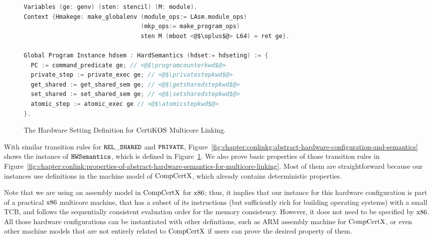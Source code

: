 \begin{figure}
\begin{lstlisting}[language=C]
Variables (ge: genv) (sten: stencil) (M: module).
Context {Hmakege: make_globalenv (module_ops:= LAsm.module_ops) 
                                 (mkp_ops:= make_program_ops) 
                                 sten M (mboot <@$\oplus$@> L64) = ret ge}.

Global Program Instance hdsem : HardSemantics (hdset:= hdseting) := {
  PC := command_predicate ge; // <@$\programcounterkwd$@>
  private_step := private_exec ge; // <@$\privatestepkwd$@>
  get_shared := get_shared_sem ge; // <@$\getsharedstepkwd$@>
  set_shared := set_shared_sem ge; // <@$\setsharedstepkwd$@>
  atomic_step := atomic_exec ge // <@$\atomicstepkwd$@>
}.
\end{lstlisting}
\caption{The Hardware Setting Definition for $\mathrm{CertiKOS}$ Multicore Linking.}
\label{fig:chapter:certikos:hardware-local-step-transition-rules}
\end{figure}

With similar transition rules for ${{\mathrm{\texttt{REL}}}\_{\mathrm{\texttt{SHARED}}}}$ and ${{\mathrm{\texttt{PRIVATE}}}}$,
Figure~\ref{fig:chapter:conlinkg:abstract-hardware-configuration-and-semantics}
shows the instance of ${\mathrm{\texttt{HWSemantics}}}$, which is defined in Figure~\ref{fig:chapter:certikos:hardware-local-step-transition-rules}. 
We also prove basic properties of those transition rules in Figure~\ref{fig:chapter:conlink:properties-of-abstract-hardware-semantics-for-multicore-linking}.
Most of them are straightforward because our instances use  definitions in the machine model of $\mathrm{CompCertX}$,
which already contains  deterministic properties. 

Note that we are using an assembly model  in $\mathrm{CompCertX}$ for $\mathrm{x86}$; thus, it implies that 
our instance for this hardware configuration is   part of a practical $\mathrm{x86}$ multicore machine,
that has a subset of its instructions (but sufficiently rich for building operating systems) with a small TCB, 
and follows the sequentially consistent evaluation order for the memory consistency. 
However, it does not need to be specified by $\mathrm{x86}$. 
All those hardware configurations can be instantiated with other definitions, such as ARM assembly machine for $\mathrm{CompCertX}$, 
or even other machine models that are not entirely related to $\mathrm{CompCertX}$ if users can prove the desired property of them.



